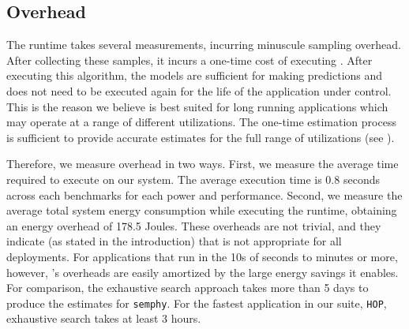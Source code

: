 \subsection{Overhead}
\label{sec:experiment:overhead}
 The
runtime takes several measurements, incurring minuscule sampling
overhead.  After collecting these samples, it incurs a one-time cost
of executing \SYSTEM{}.  After executing this algorithm, the models
are sufficient for making predictions and \SYSTEM{} does not need to
be executed again for the life of the application under control.  This
is the reason we believe \SYSTEM{} is best suited for long running
applications which may operate at a range of different utilizations.
The one-time estimation process is sufficient to provide accurate
estimates for the full range of utilizations (see
).

Therefore, we measure overhead in two ways.  First, we measure the
average time required to execute \SYSTEM{} on our system.  The average
execution time is 0.8 seconds across each benchmarks for each power
and performance.   Second, we measure the
average total system energy consumption while executing the runtime,
obtaining an energy overhead of 178.5 Joules. These overheads are not
trivial, and they indicate (as stated in the introduction) that
\SYSTEM{} is not appropriate for all deployments.  For applications
that run in the 10s of seconds to minutes or more, however,
\SYSTEM{}'s overheads are easily amortized by the large energy savings
it enables.  For comparison, the exhaustive search approach takes more
than 5 days to produce the estimates for \texttt{semphy}.  For the
fastest application in our suite, \texttt{HOP}, exhaustive search
takes at least 3 hours.


